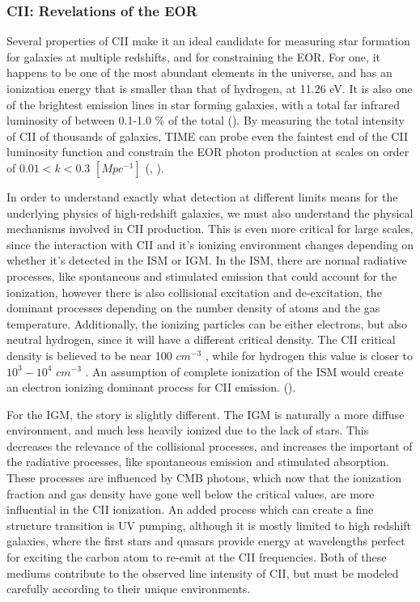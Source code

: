 \documentclass[manuscript]{aastex}
\begin{document}
\subsubsection{CII: Revelations of the EOR}
Several properties of CII make it an ideal candidate for measuring star formation for galaxies at multiple redshifts, and for constraining the EOR. For one, it happens to be one of the most abundant elements in the universe, and has an ionization energy that is smaller than that of hydrogen, at 11.26 eV. It is also one of the brightest emission lines in star forming galaxies, with a total far infrared luminosity of between 0.1-1.0 \% of the total (\cite{Stacey1991}). By measuring the total intensity of CII of thousands of galaxies, TIME can probe even the faintest end of the CII luminosity function and constrain the EOR photon production at scales on order of  $0.01 < k < 0.3$  $[Mpc^{-1}]$  (\cite{Gong2012}, \cite{Crites2014}). 

In order to understand exactly what detection at different limits means for the underlying physics of high-redshift galaxies, we must also understand the physical mechanisms involved in CII production. This is even more critical for large scales, since the interaction with CII and it's ionizing environment changes depending on whether it's detected in the ISM or IGM. In the ISM, there are normal radiative processes, like spontaneous and stimulated emission that could account for the ionization, however there is also collisional excitation and de-excitation, the dominant processes depending on the number density of atoms and the gas temperature. Additionally, the ionizing particles can be either electrons, but also neutral hydrogen, since it will have a different critical density. The CII critical density is believed to be near 100 $cm ^{-3}$ , while for hydrogen this value is closer to $10^{3} - 10^{4}$  $cm^{-3}$ .  An assumption of complete ionization of the ISM would create an electron ionizing dominant process for CII emission. (\cite{Gong2012}). 

For the IGM, the story is slightly different. The IGM is naturally a more diffuse environment, and much less heavily ionized due to the lack of stars. This decreases the relevance of the collisional processes, and increases the important of the radiative processes, like spontaneous emission and stimulated absorption. These processes are influenced by CMB photons, which now that the ionization fraction and gas density have gone well below the critical values, are more influential in the CII ionization. An added process which can create a fine structure transition is UV pumping, although it is mostly limited to high redshift galaxies, where the first stars and quasars provide energy at wavelengths perfect for exciting the carbon atom to re-emit at the CII frequencies. Both of these mediums contribute to the observed line intensity of CII, but must be modeled carefully according to their unique environments. 
\end{document}
